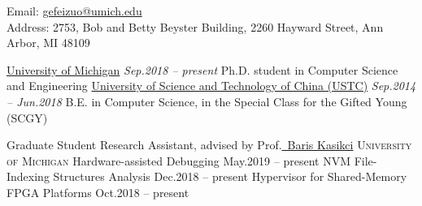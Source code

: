 \documentclass[10pt,a4paper]{article}
\newcommand{\seperator}{\spacedhrule{0.5em}{-1em}}
\begin{document}
\sloppy  %



\nobreakvspace{0.3em}  %

\noindent Email: \href{mailto:gefeizuo@umich.edu}{\mbox{gefeizuo@umich.edu}}
\\
Address: 2753, Bob and Betty Beyster Building, 2260 Hayward Street, Ann Arbor, MI 48109

\seperator  %

\headedsection
{\href{https://umich.edu}{University of Michigan}}
{\textit{Sep.2018 -- present}}
{
	\headedsubsection
	{Ph.D. student in Computer Science and Engineering}
	{}
	{}
}
\headedsection  %
{\href{http://ustc.edu.cn/}{University of Science and Technology of China (USTC)}}
{\textit{Sep.2014 -- Jun.2018}} {
	\headedsubsection
	{B.E. in Computer Science, in the Special Class for the Gifted Young (SCGY)}
	{}
	{}
}

\seperator


\headedsection
{Graduate Student Research Assistant, advised by Prof.\href{https://web.eecs.umich.edu/~barisk/}{\ Baris Kasikci}}
{\textsc{University of Michigan}}
{
	\headedsubsection
	{Hardware-assisted Debugging}
	{May.2019 -- present}
	{}
	\headedsubsection
	{NVM File-Indexing Structures Analysis}
	{Dec.2018 -- present}
	{}
	\headedsubsection
	{Hypervisor for Shared-Memory FPGA Platforms}
	{Oct.2018 -- present}
	{}
}
\end{document}

